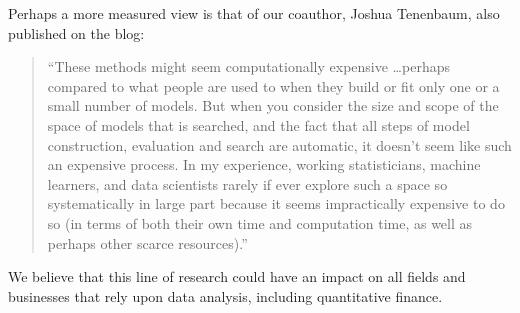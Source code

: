 \documentclass{article} %
\begin{document}
Perhaps a more measured view is that of our coauthor, Joshua Tenenbaum, also published on the blog:
\begin{quotation}
``These methods might seem computationally expensive \ldots perhaps compared to what people are used to when they build or fit only one or a small number of models.
But when you consider the size and scope of the space of models that is searched, and the fact that all steps of model construction, evaluation and search are automatic, it doesn't seem like such an expensive process.
In my experience, working statisticians, machine learners, and data scientists rarely if ever explore such a space so systematically in large part because it seems impractically expensive to do so (in terms of both their own time and computation time, as well as perhaps other scarce resources).''
\end{quotation}

We believe that this line of research could have an impact on all fields and businesses that rely upon data analysis, including quantitative finance.



\end{document}
